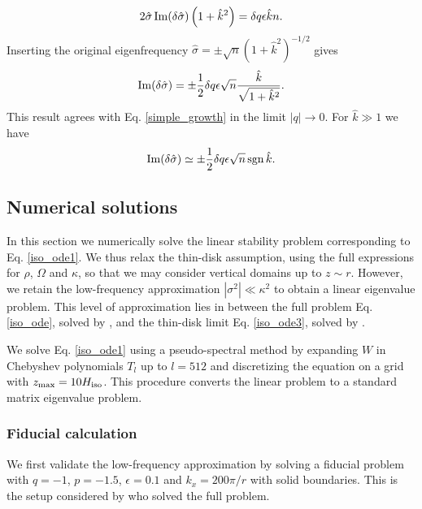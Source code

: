 \begin{align}
   2\hat{\sigma}\operatorname{Im}(\delta\hat{\sigma})
  \left(1+\hat{k}^2\right) = \delta q \epsilon \hat{k} n.
 \end{align}
Inserting the original eigenfrequency $\hat{\sigma} = \pm
\sqrt{n}(1+\hat{k}^2)^{-1/2}$ gives
\begin{align}
  \operatorname{Im}(\delta\hat{\sigma})= \pm \frac{1}{2}\delta q \epsilon
  \sqrt{n} \frac{\hat{k}}{\sqrt{1+\hat{k}^2}}. 
\end{align}
This result agrees with Eq. \ref{simple_growth} in the limit
$|q|\to0$. 
For $\hat{k}\gg 1$ we have
\begin{align}
  \operatorname{Im}(\delta\hat{\sigma})\simeq \pm \frac{1}{2}\delta q \epsilon
  \sqrt{n} \operatorname{sgn}{\hat{k}}. 
\end{align}




\subsection{Numerical solutions}
In this section we numerically solve the linear stability problem
corresponding to Eq. \ref{iso_ode1}. We thus relax the thin-disk
assumption, using the full expressions for $\rho$, $\Omega$ and
$\kappa$, so that we may consider vertical domains up to $z\sim r$.
However, we retain the low-frequency approximation
$|\sigma^2|\ll\kappa^2$ to obtain a linear eigenvalue problem. This
level of approximation lies in between the full problem 
Eq. \ref{iso_ode}, solved by \cite{mcnally14}, and the thin-disk
limit Eq. \ref{iso_ode3}, solved by \cite{nelson13}.   

We solve Eq. \ref{iso_ode1} using a pseudo-spectral method by
expanding $W$ in Chebyshev polynomials $T_l$ up to $l=512$ and
discretizing the equation on a grid with
$z_\mathrm{max}=10H_\mathrm{iso}$. This procedure converts the linear problem
to a standard matrix eigenvalue problem. %

\subsubsection{Fiducial calculation}
We first validate the low-frequency approximation by solving a 
fiducial problem with $q=-1$, $p=-1.5$, $\epsilon=0.1$ and $k_x =
200\pi/r$ with solid boundaries. This is the setup considered by
\cite{mcnally14} who solved the full problem. 


